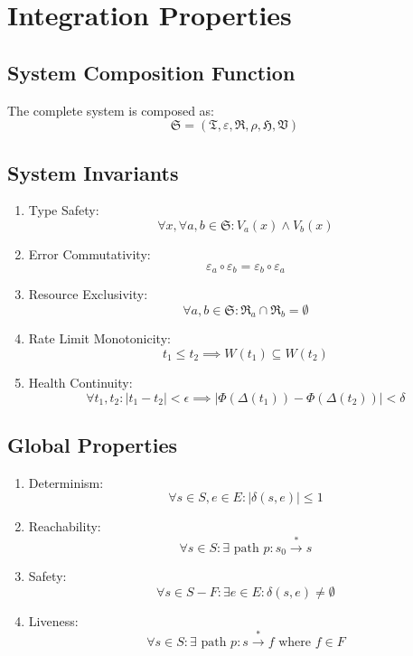 \documentclass[10pt]{article}
\begin{document}
\section{Integration Properties}

\subsection{System Composition Function}

The complete system is composed as:
$$\mathfrak{S} = (\mathfrak{T}, \varepsilon, \mathfrak{R}, \rho, \mathfrak{H}, \mathfrak{V})$$

\subsection{System Invariants}

\begin{enumerate}[leftmargin=2em]
\item Type Safety:
   $$\forall x, \forall a,b \in \mathfrak{S}: V_a(x) \wedge V_b(x)$$
\item Error Commutativity:
   $$\varepsilon_a \circ \varepsilon_b = \varepsilon_b \circ \varepsilon_a$$
\item Resource Exclusivity:
   $$\forall a,b \in \mathfrak{S}: \mathfrak{R}_a \cap \mathfrak{R}_b = \emptyset$$
\item Rate Limit Monotonicity:
   $$t_1 \leq t_2 \implies W(t_1) \subseteq W(t_2)$$
\item Health Continuity:
   $$\forall t_1,t_2: |t_1-t_2| < \epsilon \implies |\Phi(\Delta(t_1)) - \Phi(\Delta(t_2))| < \delta$$
\end{enumerate}

\subsection{Global Properties}

\begin{enumerate}[leftmargin=2em]
\item Determinism:
   $$\forall s \in S, e \in E: |\delta(s,e)| \leq 1$$
\item Reachability:
   $$\forall s \in S: \exists \text{ path } p: s_0 \xrightarrow{*} s$$
\item Safety:
   $$\forall s \in S - F: \exists e \in E: \delta(s,e) \neq \emptyset$$
\item Liveness:
   $$\forall s \in S: \exists \text{ path } p: s \xrightarrow{*} f \text{ where } f \in F$$
\end{enumerate}
\end{document}

